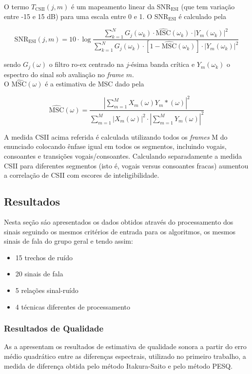 O termo $T_{\text{CSII}}(j,m)$ é um mapeamento linear da SNR$_\text{ESI}$ (que tem variação entre -15 e 15 dB) para uma escala entre 0 e 1. O SNR$_\text{ESI}$ é calculado pela 

\begin{equation}
    \text{SNR}_\text{ESI}(j,m) = 10\cdot\log\dfrac{\sum_{k=1}^NG_j(\omega_k)\cdot\widehat{\text{MSC}}(\omega_k)\cdot|Y_m(\omega_k)|^2}{\sum_{k=1}^NG_j(\omega_k)\cdot\left[1-\widehat{\text{MSC}}(\omega_k)\right]\cdot|Y_m(\omega_k)|^2}
\end{equation}

\noindent
sendo  $G_j(\omega)$ o filtro ro-ex centrado na $j$-ésima banda crítica e $Y_m(\omega_k)$ o espectro do sinal sob avaliação no \textit{frame} $m$.\\

O $\widehat{\text{MSC}}(\omega)$ é a estimativa de MSC dado pela 

\begin{equation}
\widehat{\text{MSC}}(\omega) = \dfrac{\left|\sum_{m=1}^MX_m(\omega)Y_m*(\omega)\right|^2}{\sum_{m=1}^M|X_m(\omega)|^2\cdot |\sum_{m=1}^MY_m(\omega)|^2}
    \label{msceeq}
\end{equation}


A medida CSII acima referida é calculada utilizando todos os \textit{frames} M do enunciado colocando ênfase igual em todos os segmentos, incluindo vogais, consoantes e transições vogais/consoantes. Calculando separadamente a medida CSII para diferentes segmentos (isto é, vogais versus consoantes fracas) aumentou a correlação de CSII com escores de inteligibilidade\cite{loizou2013speech}.


\subsection{Resultados}
Nesta seção sáo apresentados os dados obtidos através do processamento dos sinais seguindo os mesmos critérios de entrada para os algoritmos, os mesmos sinais de fala do grupo geral e tendo assim:
\begin{itemize}
    \item 15 trechos de ruído
    \item 20 sinais de fala
    \item 5 relações sinal-ruído
    \item 4 técnicas diferentes de processamento
\end{itemize}

\subsubsection{Resultados de Qualidade}
\label{secqual}
As  a  apresentam os resultados de estimativa de qualidade sonora a partir do erro médio quadrático entre as diferenças espectrais, utilizado no primeiro trabalho, a medida de diferença obtida pelo método Itakura-Saito e pelo método PESQ. 

